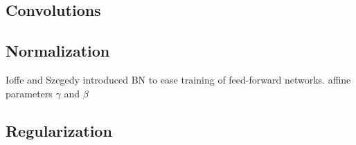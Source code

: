 \subsection{Convolutions}



\subsection{Normalization}
Ioffe and Szegedy introduced BN to ease training of feed-forward networks.
affine parameters $\gamma$ and $\beta$

\subsection{Regularization}

